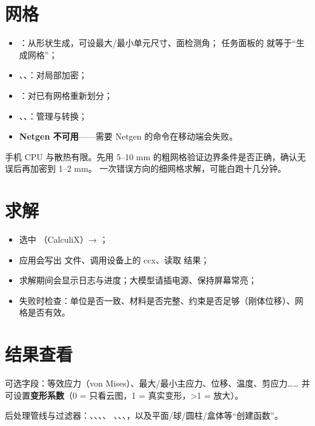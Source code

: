 \section{网格}

\begin{itemize}
  \item {}：从形状生成，可设最大/最小单元尺寸、面检测角；
        任务面板的  就等于“生成网格”；
  \item {}、、：对局部加密；
  \item {}：对已有网格重新划分；
  \item {}、、：管理与转换；
  \item \textbf{Netgen 不可用}——需要 Netgen 的命令在移动端会失败。
\end{itemize}

\begin{tip}[先粗后细]
手机 CPU 与散热有限。先用 5--10 mm 的粗网格验证边界条件是否正确，确认无误后再加密到 1--2 mm。
一次错误方向的细网格求解，可能白跑十几分钟。
\end{tip}

\section{求解}

\begin{itemize}
  \item 选中 （CalculiX）→ ；
  \item 应用会写出  文件、调用设备上的 ccx、读取  结果；
  \item 求解期间会显示日志与进度；大模型请插电源、保持屏幕常亮；
  \item 失败时检查：单位是否一致、材料是否完整、约束是否足够（刚体位移）、网格是否有效。
\end{itemize}

\section{结果查看}

 可选字段：等效应力（von Mises）、最大/最小主应力、位移、温度、剪应力……
并可设置\textbf{变形系数}（0 = 只看云图，1 = 真实变形，>1 = 放大）。

后处理管线与过滤器：、、、、
、、、，以及平面/球/圆柱/盒体等“创建函数”。

